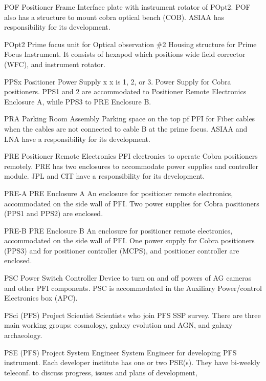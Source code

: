 {POF}
{Positioner Frame}
{Interface plate with instrument rotator of POpt2. POF also has a structure to mount cobra optical bench (COB). ASIAA has responsibility for its development.}


{POpt2}
{Prime focus unit for Optical observation \#2}
{Housing structure for Prime Focus Instrument. It consists of hexapod which positions wide field corrector (WFC), and instrument rotator.}


{PPSx}
{Positioner Power Supply x}
{x is 1, 2, or 3. Power Supply for Cobra positioners. PPS1 and 2 are accommodated to Positioner Remote Electronics Enclosure A, while PPS3 to PRE Enclosure B.}


{PRA}
{Parking Room Assembly}
{Parking space on the top pf PFI for Fiber cables when the cables are not  connected to cable B at the prime focus. ASIAA and LNA have a responsibility for its development.}


{PRE}
{Positioner Remote Electronics}
{PFI electronics to operate Cobra positioners remotely. PRE has two enclosures to accommodate power supplies and controller module. JPL and CIT have a responsibility for its development.}


{PRE-A}
{PRE Enclosure A}
{An enclosure for positioner remote electronics, accommodated on the side wall of PFI. Two power supplies for Cobra positioners (PPS1 and PPS2) are enclosed.}


{PRE-B}
{PRE Enclosure B}
{An enclosure for positioner remote electronics, accommodated on the side wall of PFI. One power supply for Cobra positioners (PPS3) and for positioner controller (MCPS), and positioner controller are enclosed.}


{PSC}
{Power Switch Controller}
{Device to turn on and off powers of AG cameras and other PFI components. PSC is accommodated in the Auxiliary Power/control Electronics box (APC).}


{PSci}
{(PFS) Project Scientist}
{Scientists who join PFS SSP survey. There are three main working groups: cosmology, galaxy evolution and AGN, and galaxy archaeology.}


{PSE}
{(PFS) Project System Engineer}
{System Engineer for developing PFS instrument. Each developer institute has one or two PSE(s). They have bi-weekly teleconf. to discuss progress, issues and plans of development,}


